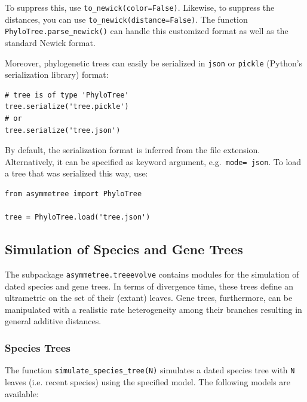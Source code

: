 \documentclass[hidelinks,11pt]{article}
\newcommand{\sq}{\textquotesingle}
\begin{document}
\noindent
To suppress this, use \texttt{to\_newick(color=False)}. Likewise, to suppress the distances, you can use \texttt{to\_newick(distance=False)}.
The function \texttt{PhyloTree.parse\_newick()} can handle this customized format as well as the standard Newick format.

Moreover, phylogenetic trees can easily be serialized in \texttt{json} or \texttt{pickle} (Python's serialization library) format:

\begin{adjustwidth}{1cm}{1cm}\vspace{2mm}
\begin{verbatim}
# tree is of type 'PhyloTree'
tree.serialize('tree.pickle')
# or
tree.serialize('tree.json')
\end{verbatim}
\end{adjustwidth}

\noindent
By default, the serialization format is inferred from the file extension.
Alternatively, it can be specified as keyword argument, e.g.\ \texttt{mode=\sq
json\sq}.
To load a tree that was serialized this way, use:

\begin{adjustwidth}{1cm}{1cm}\vspace{2mm}
\begin{verbatim}
from asymmetree import PhyloTree

tree = PhyloTree.load('tree.json')
\end{verbatim}
\end{adjustwidth}

\subsection{Simulation of Species and Gene Trees}

The subpackage \texttt{asymmetree.treeevolve} contains modules for the simulation of dated species and gene trees.
In terms of divergence time, these trees define an ultrametric on the set of their (extant) leaves.
Gene trees, furthermore, can be manipulated with a realistic rate heterogeneity among their branches resulting in general additive distances.


\subsubsection{Species Trees}

The function \texttt{simulate\_species\_tree(N)} simulates a dated species tree with \texttt{N} leaves (i.e. recent species) using the specified model.
The following models are available:
\end{document}
